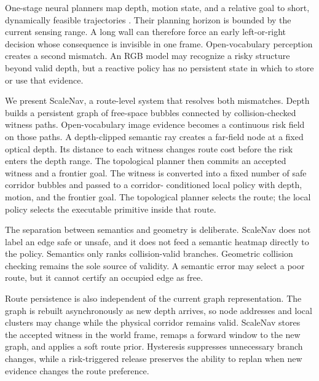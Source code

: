 \documentclass[letterpaper,10pt,conference]{ieeeconf}
\begin{document}
One-stage neural planners map depth, motion state, and a relative goal to
short, dynamically feasible trajectories \cite{yopo}.  Their planning horizon
is bounded by the current sensing range.  A long wall can therefore force an
early left-or-right
decision whose consequence is invisible in one frame.  Open-vocabulary
perception creates a second mismatch.  An RGB model may recognize a risky
structure beyond valid depth, but a reactive policy has no persistent state in
which to store or use that evidence.

We present ScaleNav, a route-level system that resolves both mismatches.  Depth
builds a persistent graph of free-space bubbles connected by
collision-checked witness paths.  Open-vocabulary image evidence becomes a
continuous risk field on those paths.  A depth-clipped semantic ray creates a
far-field node at a fixed optical depth.  Its distance to each witness changes
route cost before the risk enters the depth range.  The topological planner
then commits an accepted witness and a frontier goal.  The witness is converted
into a fixed number of safe corridor bubbles and passed to a corridor-
conditioned local policy with depth, motion, and the frontier goal.  The topological
planner selects the route; the local policy selects the executable primitive
inside that route.

The separation between semantics and geometry is deliberate.  ScaleNav does
not label an edge safe or unsafe, and it does not feed a semantic heatmap
directly to the policy.  Semantics only ranks collision-valid branches.
Geometric collision checking remains the sole source of validity.  A semantic
error may select a poor route, but it cannot certify an occupied edge as free.

Route persistence is also independent of the current graph representation.
The graph is rebuilt asynchronously as new depth arrives, so node addresses
and local clusters may change while the physical corridor remains valid.
ScaleNav stores the accepted witness in the world frame, remaps a forward
window to the new graph, and applies a soft route prior.  Hysteresis suppresses
unnecessary branch changes, while a risk-triggered release preserves the
ability to replan when new evidence changes the route preference.
\end{document}
